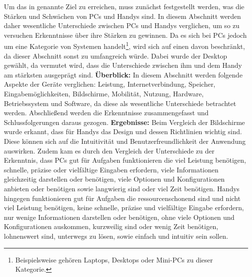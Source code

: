%
%
	Um das in  genannte Ziel zu erreichen, muss zunächst festgestellt werden, was die Stärken und Schwächen von PCs und Handys sind. %
	In diesem Abschnitt werden daher wesentliche Unterschiede zwischen PCs und Handys verglichen, um so zu versuchen Erkenntnisse über ihre Stärken zu gewinnen. %
	Da es sich bei PCs jedoch um eine Kategorie von Systemen handelt\footnote{Beispielsweise gehören Laptops, Desktops oder Mini-PCs zu dieser Kategorie.}, wird sich auf einen davon beschränkt, da dieser Abschnitt sonst zu umfangreich würde. Dabei wurde der Desktop gewählt, da vermutet wird, dass die Unterschiede zwischen ihm und dem Handy am stärksten ausgeprägt sind. \newline%
\textbf{Überblick:} %
	In diesem Abschnitt werden folgende Aspekte der Geräte verglichen: Leistung, Internetverbindung, Speicher, Eingabemöglichkeiten, Bildschirme, Mobilität, Nutzung, Hardware, Betriebssystem und Software, da diese als wesentliche Unterschiede betrachtet werden. %
	Abschließend werden die Erkenntnisse zusammengefasst und Schlussfolgerungen daraus gezogen.\newline%
\textbf{Ergebnisse:} %
	Beim Vergleich der Bildschirme wurde erkannt, dass für Handys das Design und dessen Richtlinien wichtig sind. Diese können sich auf die Intuitivität und Benutzerfreundlichkeit der Anwendung auswirken.\newline%
	Zudem kam es durch den Vergleich der Unterschiede zu der Erkenntnis, dass PCs gut für Aufgaben funktionieren %
		die viel Leistung benötigen, schnelle, präzise oder vielfältige Eingaben erfordern, viele Informationen gleichzeitig darstellen oder benötigen, viele Optionen und Konfigurationen anbieten oder benötigen sowie langwierig sind oder viel Zeit benötigen.\newline
	Handys hingegen funktionieren gut für Aufgaben %
		die ressourcenschonend sind und nicht viel Leistung benötigen, keine schnelle, präzise und vielfältige Eingabe erfordern, nur wenige Informationen darstellen oder benötigen, ohne viele Optionen und Konfigurationen auskommen, kurzweilig sind oder wenig Zeit benötigen, lohnenswert sind, unterwegs zu lösen, sowie einfach und intuitiv sein sollen.%
